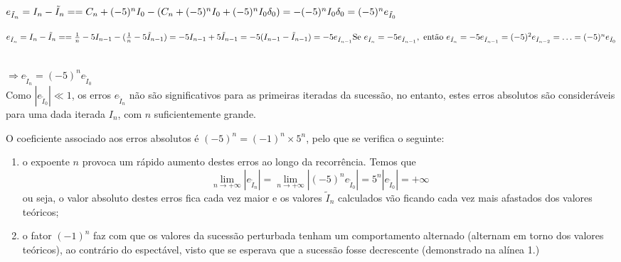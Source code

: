 \documentclass[12pt,a4paper]{article}
\begin{document}
\noindent
\begin{minipage}{0.48\textwidth}
    \(e_{\tilde{I}_n}=I_n-\tilde{I}_n=\\[25pt]
    =C_n+(-5)^nI_0-(C_n+(-5)^nI_0+(-5)^nI_0\delta_0)\\[10pt]
    =-(-5)^nI_0\delta_0\\[10pt]
    =(-5)^ne_{\tilde{I}_0}
    \)
\end{minipage}
\hfill
\vrule width 1pt
\hfill
\begin{minipage}{0.48\textwidth}
    \(e_{\tilde{I}_n}=I_n-\tilde{I}_n=\\[10pt]
    =\frac{1}{n}-5I_{n-1}-(\frac{1}{n}-5\tilde{I}_{n-1})\\[2pt]
    =-5I_{n-1}+5\tilde{I}_{n-1}\\[2pt]
    =-5(I_{n-1}-\tilde{I}_{n-1})\\[2pt]
    =-5e_{\tilde{I}_{n-1}}\\[15pt]
    \text{Se } e_{\tilde{I}_n}=-5e_{\tilde{I}_{n-1}}, \text{ então }\\[2pt]
    e_{\tilde{I}_n}=-5e_{\tilde{I}_{n-1}}=(-5)^2e_{\tilde{I}_{n-2}}=\ldots=(-5)^ne_{\tilde{I}_{0}}
    \)
\end{minipage}
\\[30pt]

$\Rightarrow e_{\tilde{I}_n}=(-5)^ne_{\tilde{I}_{0}}$\\

\noindent Como $|e_{\tilde{I}_{0}}|\ll1$, os erros $e_{\tilde{I}_n}$ não são significativos para as primeiras iteradas da sucessão, no entanto, estes erros absolutos são consideráveis para uma dada iterada $I_n$, com $n$ suficientemente grande.

\noindent O coeficiente associado aos erros absolutos é $(-5)^n=(-1)^n\times5^n$, pelo que se verifica o seguinte:
\begin{enumerate}
    \item o expoente $n$ provoca um rápido aumento destes erros ao longo da recorrência. Temos que \[\lim_{n \to +\infty} |e_{\tilde{I}_n}|=\lim_{n \to +\infty} |(-5)^ne_{\tilde{I}_{0}}|=5^n|e_{\tilde{I}_{0}}|=+\infty\] ou seja, o valor absoluto destes erros fica cada vez maior e os valores $\tilde{I}_{n}$ calculados vão ficando cada vez mais afastados dos valores teóricos;
    \item o fator $(-1)^n$ faz com que os valores da sucessão perturbada tenham um comportamento alternado (alternam em torno dos valores teóricos), ao contrário do espectável, visto que se esperava que a sucessão fosse decrescente (demonstrado na alínea 1.)
\end{enumerate}
\end{document}
